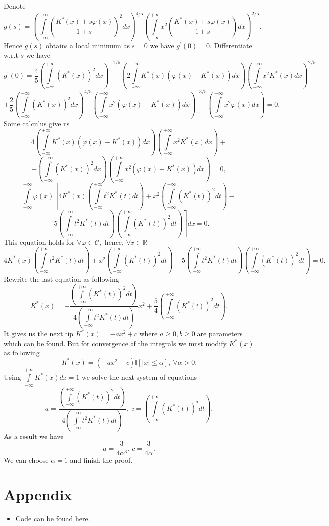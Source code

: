 \documentclass[a4paper, 12pt]{article}
\begin{document}
Denote
$$
g(s) = \left( \int \limits_{- \infty}^{+\infty} \left( \dfrac{K^*(x) + s \varphi(x)}{1 + s} \right)^2 dx \right)^{4/5} \left( \int \limits_{- \infty}^{+\infty} x^2 \left( \dfrac{K^*(x) + s \varphi(x)}{1 + s} \right) dx \right)^{2/5}.
$$ 
Hence $g(s)$ obtains a local minimum as $s = 0$ we have $g^{\prime}(0) = 0.$ 
Differentiate w.r.t $s$ we have
$$
g^{\prime}(0) = \dfrac{4}{5} \left( \int \limits_{- \infty}^{+\infty} (K^*(x))^2 dx \right)^{-1/5} 
\left( 2 \int \limits_{- \infty}^{+\infty} K^*(x) (\varphi(x) - K^*(x)) dx \right)
\left( \int \limits_{- \infty}^{+\infty} x^2 K^*(x) dx \right)^{2/5} +
$$
$$ 
+ \dfrac{2}{5} \left( \int \limits_{- \infty}^{+\infty} (K^*(x))^2 dx \right)^{4/5} 
\left( \int \limits_{- \infty}^{+\infty} x^2 (\varphi(x) - K^*(x)) dx \right)^{-3/5}
\left( \int \limits_{- \infty}^{+\infty} x^2 \varphi(x) dx \right) = 0.
$$
Some calculus give us 
$$
4 \left( \int \limits_{- \infty}^{+\infty} K^*(x) (\varphi(x) - K^*(x)) dx \right) 
\left( \int \limits_{- \infty}^{+\infty} x^2 K^*(x) dx \right) +
$$
$$ 
+ \left( \int \limits_{- \infty}^{+\infty}  (K^*(x))^2 dx \right)
\left( \int \limits_{- \infty}^{+\infty} x^2 (\varphi(x) - K^*(x)) dx \right) = 0,
$$
$$
\int \limits_{- \infty}^{+\infty} \varphi(x) \left[4 K^*(x) 
\left( \int \limits_{- \infty}^{+\infty} t^2 K^*(t) dt \right) + 
x^2 \left( \int \limits_{- \infty}^{+\infty}  (K^*(t))^2 dt \right) - \right.
$$
$$
\left. - 5 \left( \int \limits_{- \infty}^{+\infty} t^2 K^*(t) dt \right)
\left( \int \limits_{- \infty}^{+\infty}  (K^*(t))^2 dt \right)
\right] dx = 0.
$$
This equation holds for $\forall \varphi \in \mathcal{C},$ hence, $\forall x \in \mathbb{R}$
$$
4 K^*(x) 
\left( \int \limits_{- \infty}^{+\infty} t^2 K^*(t) dt \right) + 
x^2 \left( \int \limits_{- \infty}^{+\infty}  (K^*(t))^2 dt \right) - 5 \left( \int \limits_{- \infty}^{+\infty} t^2 K^*(t) dt \right)
\left( \int \limits_{- \infty}^{+\infty}  (K^*(t))^2 dt \right) = 0.
$$ 
Rewrite the last equation as following
$$
K^*(x) = - \dfrac{\left( \int \limits_{- \infty}^{+\infty}  (K^*(t))^2 dt \right)}{4\left( \int \limits_{- \infty}^{+\infty} t^2 K^*(t) dt \right)} x^2 + \dfrac{5}{4} \left( \int \limits_{- \infty}^{+\infty}  (K^*(t))^2 dt \right).
$$
It gives us the next tip $K^*(x) = -ax^2 + c$ where $a \geqslant 0, b \geqslant 0$ are parameters which can be found. 
But for convergence of the integrals we must modify $K^*(x)$ as following
$$
K^*(x) = (-ax^2 + c) \mathbb{I}[|x| \leqslant \alpha], ~ \forall \alpha > 0.
$$
Using $\int \limits_{-\infty}^{+\infty} K^*(x)dx = 1$ we solve the next system of equations
$$
a = \dfrac{\left( \int \limits_{- \infty}^{+\infty}  (K^*(t))^2 dt \right)}{4\left( \int \limits_{- \infty}^{+\infty} t^2 K^*(t) dt \right)}, ~ c = \left( \int \limits_{- \infty}^{+\infty}  (K^*(t))^2 dt \right).
$$
As a result we have
$$
a = \dfrac{3}{4 \alpha^3}, ~ c = \dfrac{3}{4\alpha}.
$$
We can choose $\alpha = 1$ and finish the proof.
\section{Appendix}
\begin{itemize}
	\item Code can be found \href{https://github.com/vitomania/ozon/blob/master/stats/hw2/Solution2.ipynb}{here}.
\end{itemize}
\end{document}
